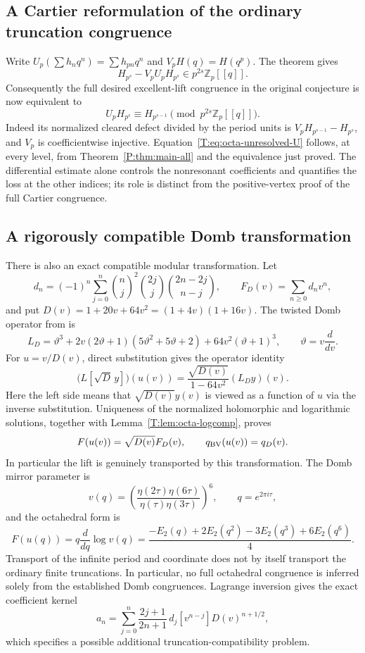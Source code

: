 \documentclass[11pt,a4paper]{article}
\theoremstyle{definition}\newtheorem{definition}[theorem]{Definition}
\theoremstyle{remark}\newtheorem{remark}[theorem]{Remark}
\numberwithin{equation}{section}
\begin{document}
\subsection{A Cartier reformulation of the ordinary truncation congruence}

Write $U_p(\sum h_nq^n)=\sum h_{pn}q^n$ and
$V_pH(q)=H(q^p)$.  The theorem gives
\[
 H_{p^s}-V_pU_pH_{p^s}\in p^{2s}\mathbb Z_p[[q]].
\]
Consequently the full desired excellent-lift congruence in the
original conjecture is now equivalent to
\begin{equation}\label{T:eq:octa-unresolved-U}
 U_pH_{p^s}\equiv H_{p^{s-1}}\pmod{p^{2s}\mathbb Z_p[[q]]}.
\end{equation}
Indeed its normalized cleared defect divided by the period units is
$V_pH_{p^{s-1}}-H_{p^s}$, and $V_p$ is coefficientwise injective.
Equation~\eqref{T:eq:octa-unresolved-U} follows, at every level, from Theorem~\ref{P:thm:main-all} and the equivalence just proved. The differential estimate alone controls the nonresonant coefficients and quantifies the loss at the other indices; its role is distinct from the positive-vertex proof of the full Cartier congruence.

\subsection{A rigorously compatible Domb transformation}

There is also an exact compatible modular transformation. Let
\[
 d_n=(-1)^n\sum_{j=0}^n\binom nj^2\binom{2j}{j}
                            \binom{2n-2j}{n-j},\qquad
 F_D(v)=\sum_{n\geq0}d_nv^n,
\]
and put $D(v)=1+20v+64v^2=(1+4v)(1+16v)$.
The twisted Domb operator from \cite[Appendix C, \S9.7]{Beu26} is
\[
 L_D=\vartheta^3+2v(2\vartheta+1)(5\vartheta^2+5\vartheta+2)
                  +64v^2(\vartheta+1)^3,
 \qquad \vartheta=v\frac d{dv}.
\]
For $u=v/D(v)$, direct substitution gives the operator identity
\[
 \bigl(L[\sqrt D\,y]\bigr)(u(v))
      =\frac{\sqrt{D(v)}}{1-64v^2}(L_Dy)(v).
\]
Here the left side means that $\sqrt{D(v)}y(v)$ is viewed as a function
of $u$ via the inverse substitution.  Uniqueness of the normalized
holomorphic and logarithmic solutions, together with
Lemma~\ref{T:lem:octa-logcomp}, proves
\[
 F(u(v))=\sqrt{D(v)}F_D(v),\qquad
 q_{\rm BV}(u(v))=q_D(v).
\]
In particular the lift is genuinely transported by this transformation.
The Domb mirror parameter is
\[
 v(q)=\left(\frac{\eta(2\tau)\eta(6\tau)}
                   {\eta(\tau)\eta(3\tau)}\right)^6,
 \qquad q=e^{2\pi i\tau},
\]
and the octahedral form is
\[
 F(u(q))=q\frac d{dq}\log v(q)
 =\frac{-E_2(q)+2E_2(q^2)-3E_2(q^3)+6E_2(q^6)}4.
\]
Transport of the infinite period and coordinate does not by itself
transport the ordinary finite truncations.  In particular, no full
octahedral congruence is inferred solely from the established Domb
congruences.  Lagrange inversion gives the exact coefficient kernel
\[
 a_n=\sum_{j=0}^n\frac{2j+1}{2n+1}\,d_j
          [v^{n-j}]D(v)^{n+1/2},
\]
which specifies a possible additional truncation-compatibility problem.
\end{document}
